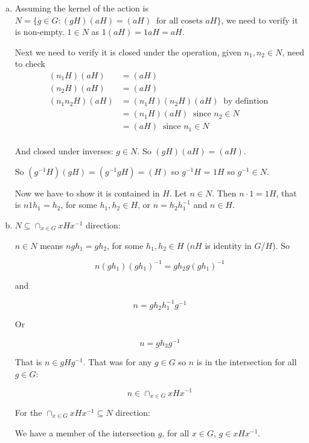 \documentclass[11pt,oneside]{article}
\numberwithin{equation}{section}
\theoremstyle{definition}
\begin{document}
\begin{solution} 
  \begin{enumerate}[(a)]
  \item
    Assuming the kernel of the action is $ N = \{ g \in G : (gH)(aH) = (aH) \ \textrm{ for all cosets } aH \}$,
    we need to verify it is non-empty.  $1 \in N$ as $1 (aH) = 1aH = aH$.

    Next we need to verify it is closed under the operation,
    given $n_1, n_2 \in N$, need to check
    \begin{align*}
      (n_1 H) (aH) &= (aH) \\
      (n_2 H) (aH) & = (aH) \\
      (n_1 n_2 H) (aH) & = (n_1H)(n_2 H) (a H) \ \textrm { by defintion } \\
      & = (n_1 H) (a H) \ \textrm{ since } n_2 \in N\\
      & = (a H) \  \textrm{ since } n_1 \in N  \\
    \end{align*}

    And closed under inverses:  $g \in N$.  So $(gH)(aH) = (aH)$.  

    So $(g^{-1} H ) ( gH) = (g^{-1} g H) = (H)$ so $g^{-1} H$ = $1H$ so $g^{-1} \in N$.  
    

    Now we have to show it is contained in $H$.  Let $n \in N$.  Then $n \cdot 1 = 1H$, that is
    $ n 1 h_1 = h_2$, for some $h_1, h_2 \in H$, or $n = h_2 h_1^{-1}$ and $n \in H$.  
    
  \item
    $N \subseteq \cap _{x \in G} xHx^{-1}$ direction:

    $n \in N$ means $n g h_1 = g h_2$, for some $h_1, h_2 \in H$ ($nH$ is identity in $G/H$).
    So

    \[
    n (g h_1) (g h_1)^{-1} = g h_2 g (g h_1)^{-1}
    \]

    and

    \[
    n = g h_2 h_1 ^{-1} g ^ {-1}
    \]

    Or

    \[
    n = g h_3 g ^ {-1}
    \]

    That is $ n \in g H g ^ {-1}$.  That was for any $g \in G$ so $n$ is in the intersection for all $g \in G$:

    \[
    n \in \cap _{x \in G} xHx^{-1}
    \]

    For the $\cap _{x \in G} xHx^{-1} \subseteq N$ direction:

    We have a member of the intersection $g$, for all $x \in G$, $g \in x H x ^ {-1}$.


\end{enumerate}
\end{solution}
\end{document}
